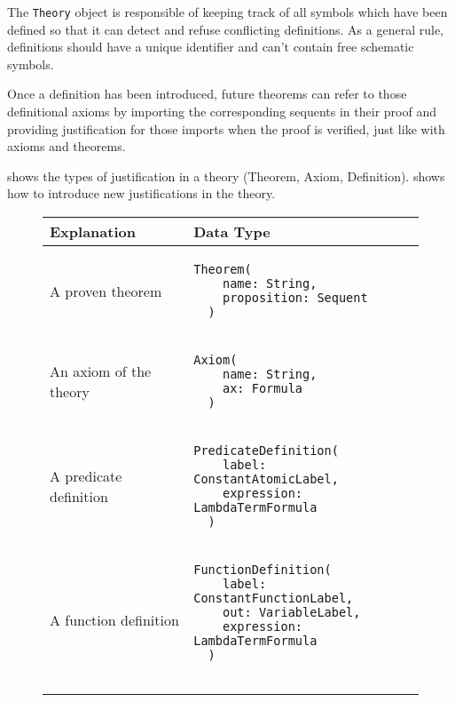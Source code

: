 The \lstinline|Theory|{} object is responsible of keeping track of all symbols which have been defined so that it can detect and refuse conflicting definitions. As a general rule, definitions should have a unique identifier and can't contain free schematic symbols.

Once a definition has been introduced, future theorems can refer to those definitional axioms by importing the corresponding sequents in their proof and providing justification for those imports when the proof is verified, just like with axioms and theorems.

 shows the types of justification in a theory (Theorem, Axiom, Definition).  shows how to introduce new justifications in the theory.

{
  \def\arraystretch{4}

  \begin{figure}[hp]
    \begin{center}
      \begin{tabular}{l|l}
        Explanation            & Data Type
        \\ \hline

        A proven theorem       &
          \begin{lstlisting}[linewidth=19.5em]
  Theorem(
    name: String,
    proposition: Sequent
  )

          \end{lstlisting}
        \\ %

        An axiom of the theory &
          \begin{lstlisting}[linewidth=19.5em]
  Axiom(
    name: String,
    ax: Formula
  )

          \end{lstlisting}
        \\ %

        A predicate definition &
          \begin{lstlisting}[linewidth=19.5em]
  PredicateDefinition(
    label: ConstantAtomicLabel,
    expression: LambdaTermFormula
  )

          \end{lstlisting}
        \\ %

        A function definition  &
          \begin{lstlisting}[linewidth=19.5em]
  FunctionDefinition(
    label: ConstantFunctionLabel,
    out: VariableLabel,
    expression: LambdaTermFormula
  )


\end{lstlisting}
\end{tabular}
\end{center}
\end{figure}}
